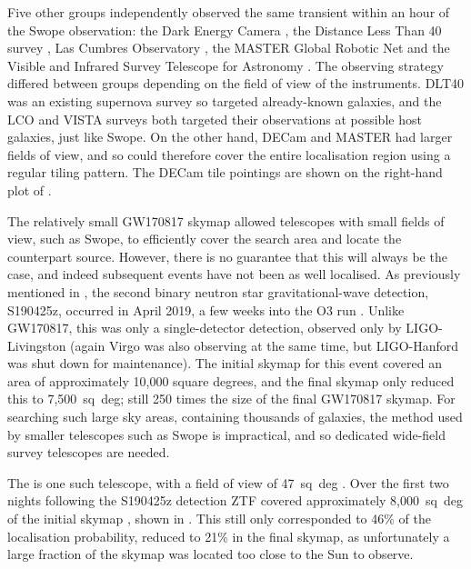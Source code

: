 \begin{colsection}
Five other groups independently observed the same transient within an hour of the Swope observation: the Dark Energy Camera \citep[DECam,][]{GW170817_DECam}, the Distance Less Than \SI{40}{\mega\parsec} survey \citep[DLT40,][]{GW170817_DLT40}, Las Cumbres Observatory \citep[LCO,][]{GW170817_LCO}, the MASTER Global Robotic Net \citep{GW170817_MASTER} and the  Visible and Infrared Survey Telescope for Astronomy \citep[VISTA,][]{GW170817_VISTA}. The observing strategy differed between groups depending on the field of view of the instruments. DLT40 was an existing supernova survey so targeted already-known galaxies, and the LCO and VISTA surveys both targeted their observations at possible host galaxies, just like Swope. On the other hand, DECam and MASTER had larger fields of view, and so could therefore cover the entire localisation region using a regular tiling pattern. The DECam tile pointings are shown on the right-hand plot of .

The relatively small GW170817 skymap allowed telescopes with small fields of view, such as Swope, to efficiently cover the search area and locate the counterpart source. However, there is no guarantee that this will always be the case, and indeed subsequent events have not been as well localised. As previously mentioned in , the second binary neutron star gravitational-wave detection, S190425z, occurred in April 2019, a few weeks into the O3 run \citep{S190425z}. Unlike GW170817, this was only a single-detector detection, observed only by LIGO-Livingston (again Virgo was also observing at the same time, but LIGO-Hanford was shut down for maintenance). The initial skymap for this event covered an area of approximately 10,000 square degrees, and the final skymap only reduced this to 7,500~sq~deg; still 250 times the size of the final GW170817 skymap. For searching such large sky areas, containing thousands of galaxies, the method used by smaller telescopes such as Swope is impractical, and so dedicated wide-field survey telescopes are needed.

The  is one such telescope, with a field of view of 47~sq~deg \citep{ZTF}. Over the first two nights following the S190425z detection ZTF covered approximately 8,000~sq~deg of the initial skymap \citep{S190425z_ZTF}, shown in . This still only corresponded to 46\% of the localisation probability, reduced to 21\% in the final skymap, as unfortunately a large fraction of the skymap was located too close to the Sun to observe.


\end{colsection}
